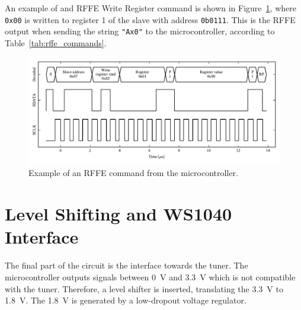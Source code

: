 An example of and RFFE Write Register command is shown in Figure~\ref{fig:rffe_example}, where \texttt{0x00} is written to register 1 of the slave with address \texttt{0b0111}. This is the RFFE output when sending the string \texttt{"Ax0"} to the microcontroller, according to Table~\ref{tab:rffe_commands}.

\begin{figure}[htbp]
    \centering
    \includegraphics{img/optical_rffe/avr_rffe_reg1_0x00}
    \caption{Example of an RFFE command from the microcontroller.}
    \label{fig:rffe_example}
\end{figure}

\section{Level Shifting and WS1040 Interface}
The final part of the circuit is the interface towards the tuner. The microcontroller outputs signals between \SI{0}{V} and \SI{3.3}{V} which is not compatible with the tuner. Therefore, a level shifter is inserted, translating the \SI{3.3}{V} to \SI{1.8}{V}. The \SI{1.8}{V} is generated by a low-dropout voltage regulator.
